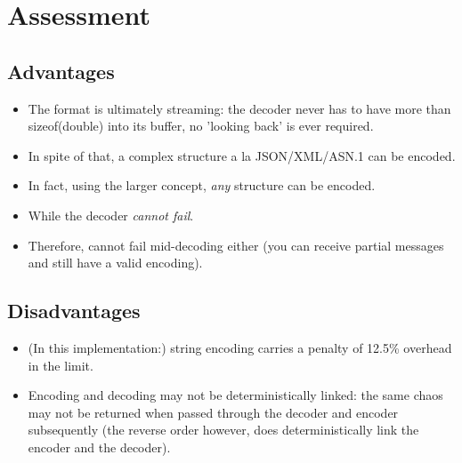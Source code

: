 \section{Assessment}

\subsection{Advantages}

\begin{itemize}
\item The format is ultimately streaming: the decoder never has to have
      more than sizeof(double) into its buffer, no 'looking back' is
      ever required.
\item In spite of that, a complex structure a la JSON/XML/ASN.1 can be
      encoded.
\item In fact, using the larger concept, \textit{any} structure can
      be encoded.
\item While the decoder \textit{cannot fail}.
\item Therefore, cannot fail mid-decoding either (you can receive
      partial messages and still have a valid encoding).
\end{itemize}

\subsection{Disadvantages}

\begin{itemize}
\item (In this implementation:)
      string encoding carries a penalty of 12.5\% overhead in the limit.
\item Encoding and decoding may not be deterministically linked: the same
      chaos may not be returned when passed through the decoder and encoder
      subsequently (the reverse order however, does deterministically link
      the encoder and the decoder).
\end{itemize}
